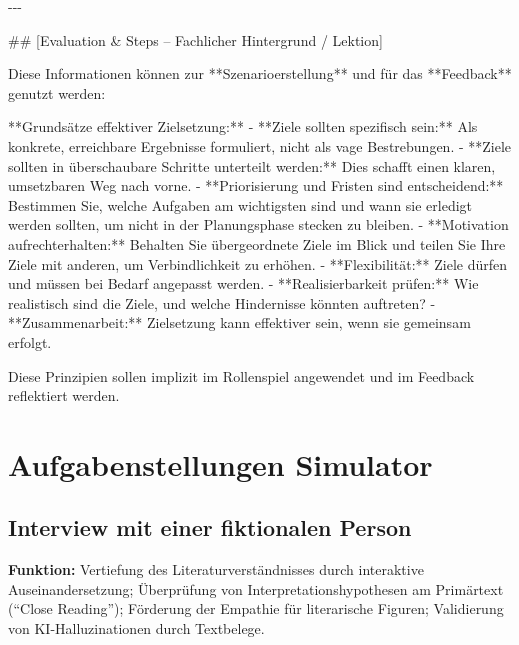 \documentclass[
  ngerman,
  letterpaper,
  DIV=11]{scrreprt}
\newenvironment{Shaded}{\begin{snugshade}}{\end{snugshade}}
\newcommand{\FunctionTok}[1]{\textcolor[rgb]{0.28,0.35,0.67}{#1}}
\newcommand{\NormalTok}[1]{\textcolor[rgb]{0.00,0.23,0.31}{#1}}
\newcommand{\SpecialStringTok}[1]{\textcolor[rgb]{0.13,0.47,0.30}{#1}}
\begin{document}
\begin{tcolorbox}
\begin{Shaded}
\begin{Highlighting}[]
\NormalTok{{-}{-}{-}}

\FunctionTok{\#\# [Evaluation \& Steps – Fachlicher Hintergrund / Lektion]}

\NormalTok{Diese Informationen können zur **Szenarioerstellung** und für das **Feedback** genutzt werden:}

\NormalTok{**Grundsätze effektiver Zielsetzung:**}
\SpecialStringTok{{-} }\NormalTok{**Ziele sollten spezifisch sein:**  }
\NormalTok{  Als konkrete, erreichbare Ergebnisse formuliert, nicht als vage Bestrebungen.  }
\SpecialStringTok{{-} }\NormalTok{**Ziele sollten in überschaubare Schritte unterteilt werden:**  }
\NormalTok{  Dies schafft einen klaren, umsetzbaren Weg nach vorne.  }
\SpecialStringTok{{-} }\NormalTok{**Priorisierung und Fristen sind entscheidend:**  }
\NormalTok{  Bestimmen Sie, welche Aufgaben am wichtigsten sind und wann sie erledigt werden sollten, um nicht in der Planungsphase stecken zu bleiben.  }
\SpecialStringTok{{-} }\NormalTok{**Motivation aufrechterhalten:**  }
\NormalTok{  Behalten Sie übergeordnete Ziele im Blick und teilen Sie Ihre Ziele mit anderen, um Verbindlichkeit zu erhöhen.  }
\SpecialStringTok{{-} }\NormalTok{**Flexibilität:**  }
\NormalTok{  Ziele dürfen und müssen bei Bedarf angepasst werden.  }
\SpecialStringTok{{-} }\NormalTok{**Realisierbarkeit prüfen:**  }
\NormalTok{  Wie realistisch sind die Ziele, und welche Hindernisse könnten auftreten?  }
\SpecialStringTok{{-} }\NormalTok{**Zusammenarbeit:**  }
\NormalTok{  Zielsetzung kann effektiver sein, wenn sie gemeinsam erfolgt.}

\NormalTok{Diese Prinzipien sollen implizit im Rollenspiel angewendet und im Feedback reflektiert werden.}
\end{Highlighting}
\end{Shaded}

\end{tcolorbox}

\section{Aufgabenstellungen
Simulator}\label{aufgabenstellungen-simulator}

\subsection{Interview mit einer fiktionalen
Person}\label{sec-prompt-interview-fiktionale-person}

\textbf{Funktion:} Vertiefung des Literaturverständnisses durch
interaktive Auseinandersetzung; Überprüfung von
Interpretationshypothesen am Primärtext (``Close Reading''); Förderung
der Empathie für literarische Figuren; Validierung von
KI-Halluzinationen durch Textbelege.
\end{document}
